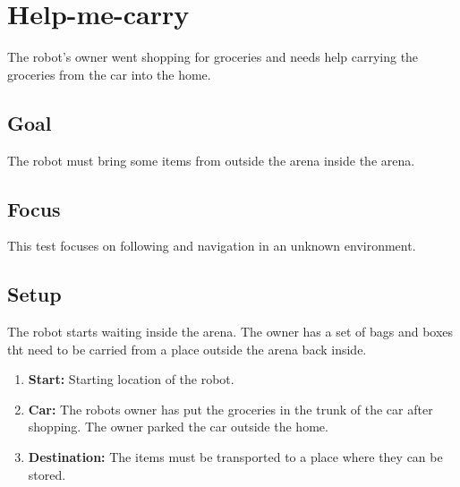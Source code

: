 \section{Help-me-carry}
The robot's owner went shopping for groceries and needs help carrying the groceries from the car into the home.

\subsection{Goal}
The robot must bring some items from outside the arena inside the arena.

\subsection{Focus}
This test focuses on following and navigation in an unknown environment. 

\subsection{Setup}
The robot starts waiting inside the arena. 
The owner has a set of bags and boxes tht need to be carried from a place outside the arena back inside. 

\begin{enumerate}
\item \textbf{Start:} Starting location of the robot. %
\item \textbf{Car:} The robots owner has put the groceries in the trunk of the car after shopping. The owner parked the car outside the home.
\item \textbf{Destination:} The items must be transported to a place where they can be stored.  
\end{enumerate}

